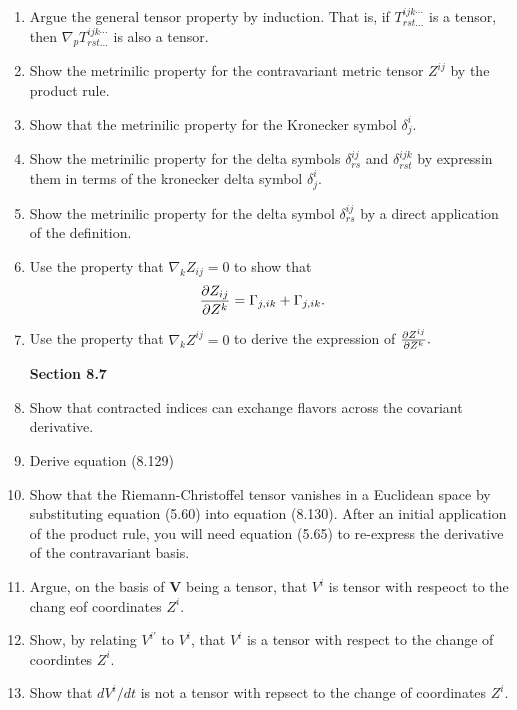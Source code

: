 \documentclass[12pt,a4paper]{report}
\newcommand{\VK}[1]{\textbf{#1}}
\begin{document}
\begin{enumerate}[label=\textbf{\arabic*.}]
\item Argue the general tensor property by induction.  That is, if $T^{ijk\cdots}_{rst\dots}$ is a tensor, then $\nabla_pT^{ijk\cdots}_{rst\dots}$ is also a tensor.

\item Show the metrinilic property for the contravariant metric tensor $Z^{ij}$ by the product rule.

\item Show that the metrinilic property for the Kronecker symbol $\delta^i_j$.

\item Show the metrinilic property for the delta symbols $\delta^{ij}_{rs}$ and $\delta^{ijk}_{rst}$ by expressin them in terms of the kronecker delta symbol $\delta^i_j$.

\item Show the metrinilic property for the delta symbol $\delta^{ij}_{rs}$ by a direct application of the definition.

\item Use the property that $\nabla_kZ_{ij}=0$ to show that
\begin{align*}
	\frac{\partial Z_{ij}}{\partial Z^k} &= \Gamma_{j,ik} + \Gamma_{j,ik}.
\end{align*}

\item Use the property that $\nabla_kZ^{ij} = 0$ to derive the expression of $
\frac{\partial Z^{ij}}{\partial Z^k}.$

\textbf{Section 8.7}
\item Show that contracted indices can exchange flavors across the covariant derivative.

\item Derive equation (8.129)

\item Show that the Riemann-Christoffel tensor vanishes in a Euclidean space by substituting equation (5.60) into equation (8.130).  After an initial application of the product rule, you will need equation (5.65) to re-express the derivative of the contravariant basis.

\item Argue, on the basis of $\VK{V}$ being a tensor, that $V^i$ is tensor with respeoct to the chang eof coordinates $Z^i$.

\item Show, by relating $V^{i'}$ to $V^i$, that $V^i$ is a tensor with respect to the change of coordintes $Z^i$.

\item Show that $dV^i/dt$ is not a tensor with repsect to the change of coordinates $Z^i$.


\end{enumerate}
\end{document}
